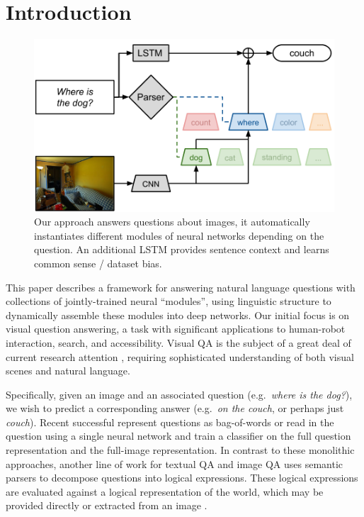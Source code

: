 \section{Introduction} 

\begin{figure}[t] \begin{center}
    \includegraphics[width=\linewidth]{fig/teaser} \end{center} \caption{Our
    approach answers questions about images, it automatically instantiates
    different modules of neural networks depending on the question. An
    additional LSTM provides sentence context and learns common sense / dataset
  bias.} \label{fig:teaser}
\end{figure}

This paper describes a framework for answering natural language questions with
collections of jointly-trained neural ``modules'', using linguistic structure to
dynamically assemble these modules into deep networks. Our initial focus is on
visual question answering, a task with significant applications to human-robot
interaction, search, and accessibility. Visual QA is the subject of a great deal
of current research attention 
\cite{antol15iccv,gao2015you,ma15arxiv,malinowski15iccv,ren2015image,yu15arxiv}, 
requiring sophisticated understanding of both visual scenes and natural
language.

Specifically, given an image and an associated question (e.g.\ \emph{where is
the dog?}), we wish to predict a corresponding answer (e.g.\ \emph{on the couch},
or perhaps just \emph{couch}). Recent successful represent questions as
bag-of-words \cite{} or read in the question using a single neural network
\cite{malinowski15iccv}\cite{} and train a classifier on the full question
representation and the full-image representation. In contrast to these
monolithic approaches, another line of work for textual QA \cite{Liang13DCS} and
image QA \cite{malinowski14nips} uses semantic parsers to decompose questions
into logical expressions. These logical expressions are evaluated against a
logical representation of the world, which may be provided directly or extracted
from an image \cite{Krish2013Grounded}.

